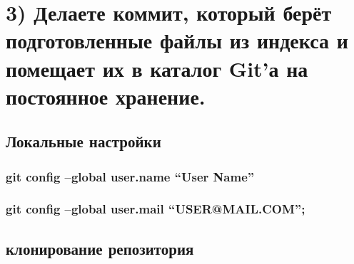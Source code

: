 \documentclass[11pt]{article}
\begin{document}
\hypertarget{ux434ux435ux43bux430ux435ux442ux435-ux43aux43eux43cux43cux438ux442-ux43aux43eux442ux43eux440ux44bux439-ux431ux435ux440ux451ux442-ux43fux43eux434ux433ux43eux442ux43eux432ux43bux435ux43dux43dux44bux435-ux444ux430ux439ux43bux44b-ux438ux437-ux438ux43dux434ux435ux43aux441ux430-ux438-ux43fux43eux43cux435ux449ux430ux435ux442-ux438ux445-ux432-ux43aux430ux442ux430ux43bux43eux433-gitux430-ux43dux430-ux43fux43eux441ux442ux43eux44fux43dux43dux43eux435-ux445ux440ux430ux43dux435ux43dux438ux435.}{%
\section{3) Делаете коммит, который берёт подготовленные файлы из
индекса и помещает их в каталог Git'а на постоянное
хранение.}\label{ux434ux435ux43bux430ux435ux442ux435-ux43aux43eux43cux43cux438ux442-ux43aux43eux442ux43eux440ux44bux439-ux431ux435ux440ux451ux442-ux43fux43eux434ux433ux43eux442ux43eux432ux43bux435ux43dux43dux44bux435-ux444ux430ux439ux43bux44b-ux438ux437-ux438ux43dux434ux435ux43aux441ux430-ux438-ux43fux43eux43cux435ux449ux430ux435ux442-ux438ux445-ux432-ux43aux430ux442ux430ux43bux43eux433-gitux430-ux43dux430-ux43fux43eux441ux442ux43eux44fux43dux43dux43eux435-ux445ux440ux430ux43dux435ux43dux438ux435.}}

    \hypertarget{ux43bux43eux43aux430ux43bux44cux43dux44bux435-ux43dux430ux441ux442ux440ux43eux439ux43aux438}{%
\subsection{Локальные
настройки}\label{ux43bux43eux43aux430ux43bux44cux43dux44bux435-ux43dux430ux441ux442ux440ux43eux439ux43aux438}}

\hypertarget{git-config-global-user.name-user-name}{%
\subsubsection{git config --global user.name ``User
Name''}\label{git-config-global-user.name-user-name}}

\hypertarget{git-config-global-user.mail-usermail.com}{%
\subsubsection{git config --global user.mail
``USER@MAIL.COM'';}\label{git-config-global-user.mail-usermail.com}}

    \hypertarget{ux43aux43bux43eux43dux438ux440ux43eux432ux430ux43dux438ux435-ux440ux435ux43fux43eux437ux438ux442ux43eux440ux438ux44f}{%
\subsection{клонирование
репозитория}\label{ux43aux43bux43eux43dux438ux440ux43eux432ux430ux43dux438ux435-ux440ux435ux43fux43eux437ux438ux442ux43eux440ux438ux44f}}
\end{document}
